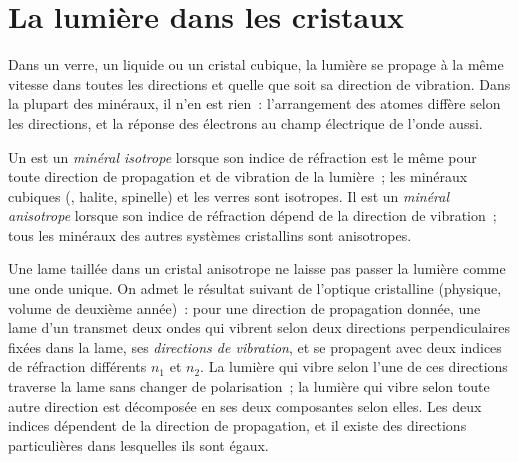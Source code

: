 \section{La lumière dans les cristaux}

Dans un verre, un liquide ou un cristal cubique, la lumière se propage à la même
vitesse dans toutes les directions et quelle que soit sa direction de vibration.
Dans la plupart des minéraux, il n'en est rien~: l'arrangement des atomes diffère
selon les directions, et la réponse des électrons au champ électrique de l'onde
aussi.

\begin{definition}\label{def:b1:optical-mineralogy:anisotropic}
Un  est un \emph{minéral isotrope} lorsque son indice de
réfraction est le même pour toute direction de propagation et de vibration de la
lumière~; les minéraux cubiques (, halite, spinelle) et les verres sont
isotropes. Il est un \emph{minéral anisotrope}
lorsque son indice de réfraction dépend de la direction de vibration~; tous les
minéraux des autres systèmes cristallins sont anisotropes.
\end{definition}

Une lame taillée dans un cristal anisotrope ne laisse pas passer la lumière comme
une onde unique. On admet le résultat suivant de l'optique cristalline (physique,
volume de deuxième année)~: pour une direction de propagation donnée, une lame
d'un  transmet deux ondes qui vibrent selon deux directions
perpendiculaires fixées dans la lame, ses \emph{directions de vibration}, et se
propagent avec deux indices de réfraction différents $n_1$ et $n_2$. La lumière
qui vibre selon l'une de ces directions traverse la lame sans changer de
polarisation~; la lumière qui vibre selon toute autre direction est décomposée en
ses deux composantes selon elles. Les deux indices dépendent de la direction de
propagation, et il existe des directions particulières dans lesquelles ils sont
égaux.

